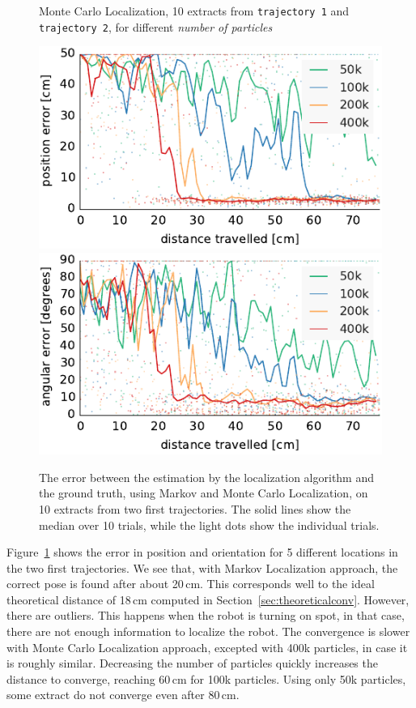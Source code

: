 \documentclass[letterpaper, 10pt, conference]{ieeeconf}
\newcommand{\Fig}[1]{Figure~\ref{fig:#1}}
\newcommand{\sect}[1]{Section~\ref{sec:#1}}
\begin{document}
\begin{figure}
\begin{center}
Monte Carlo Localization, 10 extracts from \texttt{trajectory~1} and \texttt{trajectory~2}, for different \emph{number of particles}
\end{center}
\includegraphics{mcl-small_runs_random_12-xy}\hfill
\includegraphics{mcl-small_runs_random_12-theta}

\caption{
The error between the estimation by the localization algorithm and the ground truth, using Markov and Monte Carlo Localization, on 10 extracts from two first trajectories.
The solid lines show the median over 10 trials, while the light dots show the individual trials.}
\label{fig:small-runs}
\end{figure}

\Fig{small-runs} shows the error in position and orientation for 5 different locations in the two first trajectories.
We see that, with Markov Localization approach, the correct pose is found after about 20\,cm.
This corresponds well to the ideal theoretical distance of 18\,cm computed in \sect{theoreticalconv}.
However, there are outliers.
This happens when the robot is turning on spot, in that case, there are not enough information to localize the robot.
The convergence is slower with Monte Carlo Localization approach, excepted with 400k particles, in case it is roughly similar.
Decreasing the number of particles quickly increases the distance to converge, reaching 60\,cm for 100k particles.
Using only 50k particles, some extract do not converge even after 80\,cm.
\end{document}
